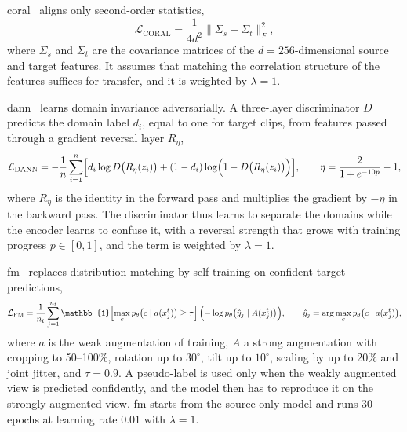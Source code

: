 \documentclass[pdflatex,sn-mathphys-num]{sn-jnl}
\begin{document}
\ac{coral}~\cite{sun2016deepcoral} aligns only second-order statistics,
\begin{equation}
  \mathcal{L}_{\mathrm{CORAL}}=\frac{1}{4d^2}\bigl\|\Sigma_s-\Sigma_t\bigr\|_F^2,
  \label{eq:coral}
\end{equation}
where $\Sigma_s$ and $\Sigma_t$ are the covariance matrices of the
$d=256$-dimensional source and target features. It assumes that matching the
correlation structure of the features suffices for transfer, and it is weighted
by $\lambda=1$.

\ac{dann}~\cite{ganin2016dann} learns domain invariance adversarially. A
three-layer discriminator $D$ predicts the domain label $d_i$, equal to one for
target clips, from features passed through a gradient reversal layer
$R_\eta$,
\begin{equation}
  \mathcal{L}_{\mathrm{DANN}}=-\frac{1}{n}\sum_{i=1}^{n}
  \Bigl[d_i\log D\bigl(R_\eta(z_i)\bigr)+(1-d_i)\log\Bigl(1-D\bigl(R_\eta(z_i)\bigr)\Bigr)\Bigr],
  \qquad\eta=\frac{2}{1+e^{-10p}}-1,
  \label{eq:dann}
\end{equation}
where $R_\eta$ is the identity in the forward pass and multiplies the gradient
by $-\eta$ in the backward pass. The discriminator thus learns to separate the
domains while the encoder learns to confuse it, with a reversal strength that
grows with training progress $p\in[0,1]$, and the term is weighted by
$\lambda=1$.

\ac{fm}~\cite{sohn2020fixmatch} replaces distribution matching by
self-training on confident target predictions,
\begin{equation}
  \mathcal{L}_{\mathrm{FM}}=\frac{1}{n_t}\sum_{j=1}^{n_t}
  \mathbb{1}\Bigl[\max_c p_\theta\bigl(c\mid a(x_j^t)\bigr)\ge\tau\Bigr]\,
  \Bigl(-\log p_\theta\bigl(\hat{y}_j\mid A(x_j^t)\bigr)\Bigr),\qquad
  \hat{y}_j=\arg\max_c p_\theta\bigl(c\mid a(x_j^t)\bigr),
  \label{eq:fm}
\end{equation}
where $a$ is the weak augmentation of training, $A$ a strong augmentation with
cropping to 50--100\%, rotation up to $30^\circ$, tilt up to $10^\circ$,
scaling by up to 20\% and joint jitter, and $\tau=0.9$. A pseudo-label is used
only when the weakly augmented view is predicted confidently, and the model
then has to reproduce it on the strongly augmented view. \ac{fm} starts from
the source-only model and runs 30 epochs at learning rate $0.01$ with
$\lambda=1$.
\end{document}
